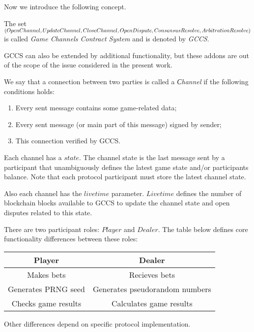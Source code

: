 Now we introduce the following concept. 
\begin{defn}
The set $ (OpenChannel, UpdateChannel, CloseChannel,\\ OpenDispute,  ConsensusResolve, ArbitrationResolve) $
is called \textit {Game Channels Contract System} and is denoted by \textit {GCCS}. 
\end{defn}

\begin{remark}
GCCS can also be extended by additional functionality, but these addons are out of the scope of the issue considered in the present work. 
\end{remark}

\begin{defn}
We say that a connection between two parties is called a \textit {Сhannel} if the following conditions holds:
	\begin{enumerate}
		\item Every sent message contains some game-related data;
		\item Every sent message (or main part of this message) signed by sender;
		\item This connection verified by GCCS. 
	\end{enumerate}
\end{defn}

Each channel has a $state$. The channel state is the last message sent by a participant that unambiguously defines the latest game state and/or participants balance. Note that each protocol participant must store the latest channel state. 

Also each channel has the  $livetime$ parameter. $Livetime$ defines the number of blockchain blocks available to GCCS to update the channel state and open disputes related to this state. 

There are two participant roles: $ Player $ and $Dealer$. The table below defines core functionality differences between these roles:
\begin{center}
\begin{tabular}{ |c|c| } 
 \hline
 \textbf{Player} & \textbf{Dealer} \\ 
 \hline
 Makes bets & Recieves bets \\ 
 Generates PRNG seed & Generates pseudorandom numbers \\ 
 Checks game results & Calculates game results\\
 \hline
\end{tabular}
\end{center}
Other differences depend on specific protocol implementation.

